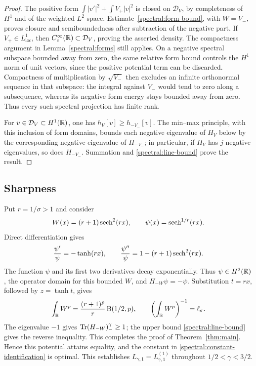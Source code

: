 \begin{proof}
The positive form $\int|v'|^2+\int V_+|v|^2$ is closed on
$\mathcal D_V$, by completeness of $H^1$ and of the weighted $L^2$
space.  Estimate~\eqref{spectral:form-bound}, with $W=V_-$, proves
closure and semiboundedness after subtraction of the negative part.
If $V_+\in L^1_{\mathrm{loc}}$, then
$C_c^\infty(\mathbb R)\subset\mathcal D_V$, proving the asserted density.
The compactness argument in Lemma~\ref{spectral:forms} still applies.
On a negative spectral subspace bounded away from zero, the same relative
form bound controls the $H^1$ norm of unit vectors, since the positive
potential term can be discarded. Compactness of multiplication by
$\sqrt{V_-}$ then excludes an infinite orthonormal sequence in that
subspace: the integral against $V_-$ would tend to zero along a subsequence,
whereas its negative form energy stays bounded away from zero. Thus every
such spectral projection has finite rank.

For $v\in\mathcal D_V\subset H^1(\mathbb R)$, one has
$h_V[v]\geq h_{-V_-}[v]$.  The min--max principle, with this inclusion
of form domains, bounds each negative eigenvalue of $H_V$ below by
the corresponding negative eigenvalue of $H_{-V_-}$; in particular,
if $H_V$ has $j$ negative eigenvalues, so does $H_{-V_-}$. Summation and
\eqref{spectral:line-bound} prove the result.
\end{proof}

\subsection{Sharpness}

Put $r=1/\sigma>1$ and consider
\[
 W(x)=(r+1)\operatorname{sech}^2(rx),
 \qquad
 \psi(x)=\operatorname{sech}^{1/r}(rx).
\]
Direct differentiation gives
\[
 \frac{\psi'}{\psi}=-\tanh(rx),
 \qquad
 \frac{\psi''}{\psi}=1-(r+1)\operatorname{sech}^2(rx).
\]
The function $\psi$ and its first two derivatives decay exponentially.
Thus $\psi\in H^2(\mathbb R)$, the operator domain for this bounded $W$,
and $H_{-W}\psi=-\psi$.
Substitution $t=rx$, followed by $z=\tanh t$, gives
\[
 \int_\mathbb R W^p
 =\frac{(r+1)^p}{r}\,\mathrm B(1/2,p),
 \qquad
 \left(\int_\mathbb R W^p\right)^{-1}=\ell_\sigma.
\]
The eigenvalue $-1$ gives $\operatorname{Tr}(H_{-W})_-^\gamma\geq1$; the upper
bound \eqref{spectral:line-bound} gives the reverse inequality.
This completes the proof of Theorem~\ref{thm:main}.
Hence this potential attains equality, and the constant in
\eqref{spectral:constant-identification} is optimal.  This establishes
$L_{\gamma,1}=L_{\gamma,1}^{(1)}$ throughout $1/2<\gamma<3/2$.
